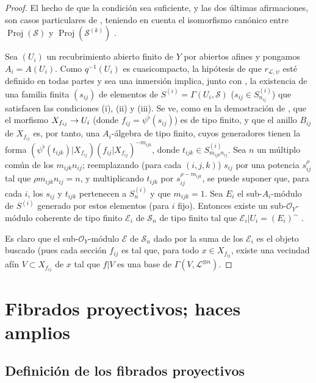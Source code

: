 \documentclass[oneside,10pt]{amsart}
\makeatletter
\newcommand{\ega@arrow}[2]{\mathchoice{#1}{#2}{#2}{#2}}
\renewcommand{\to}{\ega@arrow{\longrightarrow}{\rightarrow}}
\newcommand{\oldpage}[2][]{\marginnote{\normalfont\footnotesize\textbf{#1}~|~#2}\ignorespaces}
\let\EGAOriginalLabel\label
\renewcommand{\label}[1]{\phantomsection\EGAOriginalLabel{#1}}
\makeatother
\begin{document}
\begin{proof}
El hecho de que la condición sea suficiente, y las dos últimas afirmaciones, son casos particulares de , teniendo en cuenta el isomorfismo canónico entre $\operatorname{Proj}(\mathcal{S})$ y $\operatorname{Proj}(\mathcal{S}^{(k)})$ .

Sea $(U_i)$ un recubrimiento abierto finito de $Y$ por abiertos afines y pongamos $A_i=A(U_i)$.
Como $q^{-1}(U_i)$ es cuasicompacto, la hipótesis de que $r_{\mathcal{L},\psi}$ esté definido en todas partes y sea una inmersión implica, junto con , la existencia de una familia finita $(s_{ij})$ de elementos de $S^{(i)}=\Gamma(U_i,\mathcal{S})$ ($s_{ij}\in S_{n_{ij}}^{(i)}$) que satisfacen las condiciones (i), (ii) y (iii).
Se ve, como en la demostración de , que el morfismo $X_{f_{ij}}\to U_i$ (donde $f_{ij}=\psi^\flat(s_{ij})$) es de tipo finito, y que el anillo $B_{ij}$ de $X_{f_{ij}}$ es, por tanto, una $A_i$-álgebra de tipo finito, cuyos generadores tienen la forma $(\psi^\flat(t_{ijk})|X_{f_{ij}})(f_{ij}|X_{f_{ij}})^{-m_{ijk}}$, donde $t_{ijk}\in S_{m_{ijk}n_{ij}}^{(i)}$.
Sea $n$ un múltiplo común de los $m_{ijk}n_{ij}$;
reemplazando (para cada $(i,j,k)$) $s_{ij}$ por una potencia $s_{ij}^\rho$ tal que $\rho m_{ijk}n_{ij}=n$, y multiplicando $t_{ijk}$ por $s_{ij}^{\rho-m_{ijk}}$, se puede suponer que, para cada $i$, los $s_{ij}$ y $t_{ijk}$ pertenecen a $S_n^{(i)}$ y que $m_{ijk}=1$.
Sea $E_i$ el sub-$A_i$-módulo de $S^{(i)}$ generado por estos elementos (para $i$ fijo).
Entonces existe un sub-$\mathcal{O}_Y$-módulo coherente de tipo 
\oldpage[II]{71}
finito $\mathcal{E}_i$ de $\mathcal{S}_n$ de tipo finito tal que $\mathcal{E}_i|U_i=(E_i)^{\sim}$ .

Es claro que el sub-$\mathcal{O}_Y$-módulo $\mathcal{E}$ de $\mathcal{S}_n$ dado por la suma de los $\mathcal{E}_i$ es el objeto buscado (pues cada sección $f_{ij}$ es tal que, para todo $x\in X_{f_{ij}}$, existe una vecindad afín $V\subset X_{f_{ij}}$ de $x$ tal que $f|V$ es una base de $\Gamma(V,\mathcal{L}^{\otimes n})$.
\end{proof}

\section{Fibrados proyectivos; haces amplios}
\label{section:II.4-fr}

\subsection{Definición de los fibrados proyectivos}
\label{subsection:II.4.1-fr}
\end{document}
